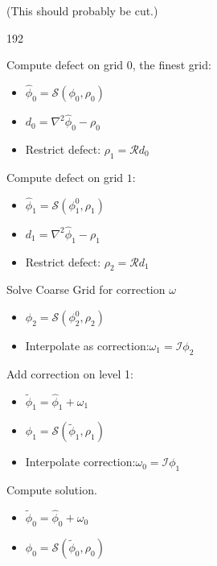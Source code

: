 	(This should probably be cut.)

\begin{dingautolist}{192}
			\item Compute defect on grid \(0\), the finest grid:
		\begin{itemize}
			\item	\( \widehat{\phi}_0 = \mathcal{S}(\phi_0, \rho_0)\)
			\item 	\(d_0 = \nabla^2\widehat{\phi}_0 - \rho_0\)
			\item Restrict defect: \(\rho_1 = \mathcal{R}d_0 \) \nonumber
		\end{itemize}
	\item Compute defect on grid \(1\):
		\begin{itemize}
			\item \(\widehat{\phi}_1 = \mathcal{S}(\phi_1^0, \rho_1)\)
			\item \(d_1 = \nabla^2\widehat{\phi}_1 - \rho_1 \)
			\item Restrict defect: \(\rho_2 = \mathcal{R}d_1 \)
		\end{itemize}
	\item Solve Coarse Grid for correction \(\omega\)
		\begin{itemize}
			\item \( \phi_2 = \mathcal{S}(\phi_2^0, \rho_2)\)
			\item Interpolate as correction:\(\omega_1 = \mathcal{I}\phi_2\)
		\end{itemize}
	\item Add correction on level 1:
		\begin{itemize}
			\item \(\widetilde{\phi}_1 = \widehat{\phi}_1 + \omega_1\)
			\item \( \phi_1 = \mathcal{S}(\widetilde{\phi}_1, \rho_1)  \)
			\item Interpolate correction:\( \omega_0 = \mathcal{I} \phi_1\)
		\end{itemize}
	\item Compute solution.
		\begin{itemize}
			\item \(\widetilde{\phi}_0 = \widehat{\phi}_0 + \omega_0\)
			\item \( \phi_0 = \mathcal{S}(\widetilde{\phi}_0, \rho_0)  \)
		\end{itemize}
\end{dingautolist}
